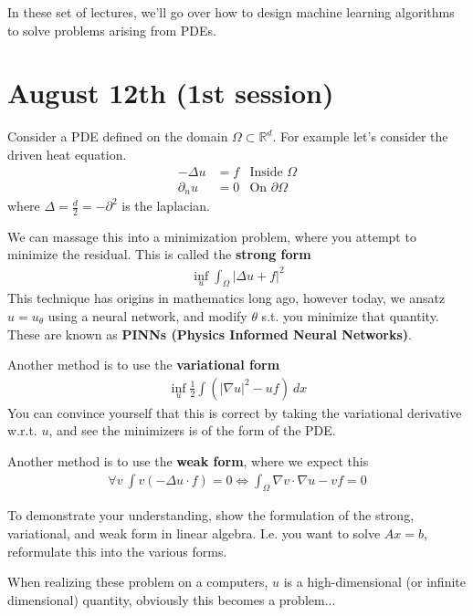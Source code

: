 In these set of lectures, we'll go over how to design machine learning algorithms to solve problems arising from PDEs.

\section{August 12th (1st session)}
Consider a PDE defined on the domain $\Omega \subset \mathbb R^d$. For example let's consider the driven heat equation.
\begin{align}
	-\Delta u &= f & \text{Inside } \Omega\\
	\partial_n u  &= 0 & \text{On } \partial \Omega
\end{align}
where $\Delta = \frac{d}{2} = - \partial^2$ is the laplacian.

We can massage this into a minimization problem, where you attempt to minimize the residual. This is called the \textbf{strong form}
\begin{align}
	\inf_u \int_\Omega |\Delta u + f|^2 
\end{align}
This technique has origins in mathematics long ago, however today, we ansatz $u=u_\theta$ using a neural network, and modify $\theta$ s.t. you minimize that quantity. These are known as \textbf{PINNs (Physics Informed Neural Networks)}.

Another method is to use the \textbf{variational form}
\begin{align}
	\inf_u \frac{1}{2} \int (|\nabla u|^2 - u f) ~dx 
\end{align}
You can convince yourself that this is correct by taking the variational derivative w.r.t. $u$, and see the minimizers is of the form of the PDE.

Another method is to use the \textbf{weak form}, where we expect this
\begin{align}
	\forall v~ \int v (-\Delta u \cdot f) = 0 \iff \int_\Omega \nabla v \cdot \nabla u - v f = 0
\end{align}

\begin{problem}
	To demonstrate your understanding, show the formulation of the strong, variational, and weak form in linear algebra. I.e. you want to solve $A x = b$, reformulate this into the various forms. 
\end{problem}

When realizing these problem on a computers, $u$ is a high-dimensional (or infinite dimensional) quantity, obviously this becomes a problem...

